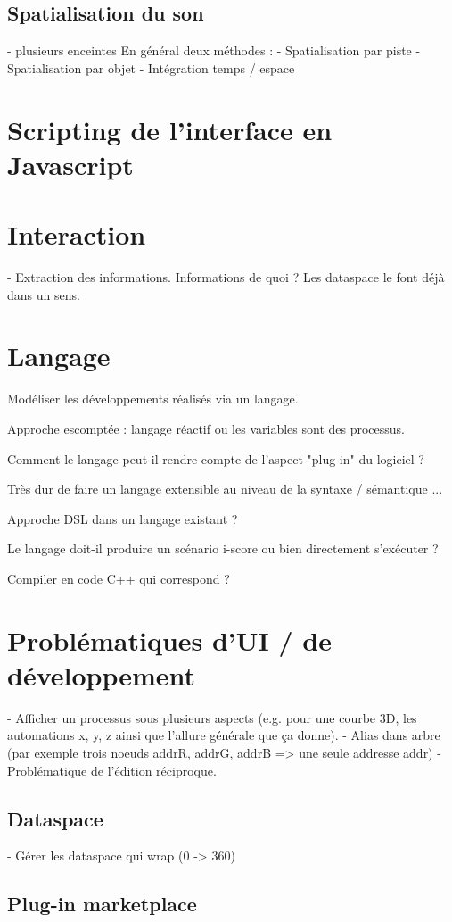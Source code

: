 \documentclass[french,a4paper]{book}
\begin{document}
\subsection{Spatialisation du son}
- plusieurs enceintes
En général deux méthodes :
- Spatialisation par piste
- Spatialisation par objet
- Intégration temps / espace
\section{Scripting de l'interface en Javascript}

\section{Interaction}
- Extraction des informations.
Informations de quoi ? Les dataspace le font déjà dans un sens.

\section{Langage}
Modéliser les développements réalisés via un langage.

Approche escomptée : langage réactif ou les variables sont des processus.

Comment le langage peut-il rendre compte de l'aspect "plug-in" du logiciel ? 

Très dur de faire un langage extensible au niveau de la syntaxe / sémantique ...

Approche DSL dans un langage existant ?

Le langage doit-il produire un scénario i-score ou bien directement s'exécuter ? 

Compiler en code C++ qui correspond ? 

\section{Problématiques d'UI / de développement}
- Afficher un processus sous plusieurs aspects (e.g. pour une courbe 3D, les automations x, y, z ainsi que l'allure générale que ça donne).
- Alias dans arbre (par exemple trois noeuds addrR, addrG, addrB => une seule addresse addr)
- Problématique de l'édition réciproque.
\subsection{Dataspace}
- Gérer les dataspace qui wrap (0 -> 360)
\subsection{Plug-in marketplace}
\end{document}
